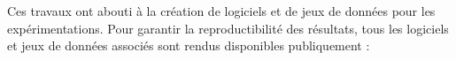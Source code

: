 Ces travaux ont abouti à la création de logiciels et de jeux de données pour les expérimentations.
Pour garantir la reproductibilité des résultats, tous les logiciels et jeux de données associés sont rendus disponibles publiquement :

\begin{bibunit}[alphaurl]
    \nocite{chabinSetUpSchemaEvolution2020}
    \nocite{chabinDataFix2023}
    \nocite{chabinArchiTXT2024}

    \renewcommand{\bibname}{}
    \renewcommand{\section}[1]{}
\end{bibunit}
